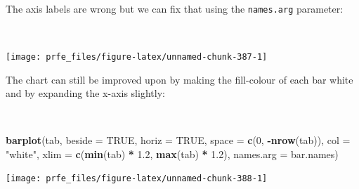 \documentclass[12pt,a4paper]{book}
\newenvironment{Shaded}{\begin{snugshade}}{\end{snugshade}}
\newcommand{\DataTypeTok}[1]{\textcolor[rgb]{0.13,0.29,0.53}{#1}}
\newcommand{\DecValTok}[1]{\textcolor[rgb]{0.00,0.00,0.81}{#1}}
\newcommand{\FloatTok}[1]{\textcolor[rgb]{0.00,0.00,0.81}{#1}}
\newcommand{\KeywordTok}[1]{\textcolor[rgb]{0.13,0.29,0.53}{\textbf{#1}}}
\newcommand{\NormalTok}[1]{#1}
\newcommand{\OperatorTok}[1]{\textcolor[rgb]{0.81,0.36,0.00}{\textbf{#1}}}
\newcommand{\OtherTok}[1]{\textcolor[rgb]{0.56,0.35,0.01}{#1}}
\newcommand{\StringTok}[1]{\textcolor[rgb]{0.31,0.60,0.02}{#1}}
\theoremstyle{definition}
\theoremstyle{definition}
\theoremstyle{definition}
\theoremstyle{remark}
\begin{document}
~

The axis labels are wrong but we can fix that using the
\texttt{names.arg} parameter:

~

\begin{Shaded}
\end{Shaded}

\begin{center}\texttt{[image: prfe\_files/figure-latex/unnamed-chunk-387-1]} \end{center}

\newpage

The chart can still be improved upon by making the fill-colour of each
bar white and by expanding the x-axis slightly:

~

\begin{Shaded}
\begin{Highlighting}[]
\KeywordTok{barplot}\NormalTok{(tab, }\DataTypeTok{beside =} \OtherTok{TRUE}\NormalTok{, }\DataTypeTok{horiz =} \OtherTok{TRUE}\NormalTok{, }\DataTypeTok{space =} \KeywordTok{c}\NormalTok{(}\DecValTok{0}\NormalTok{, }\OperatorTok{-}\KeywordTok{nrow}\NormalTok{(tab)),}
        \DataTypeTok{col =} \StringTok{"white"}\NormalTok{, }\DataTypeTok{xlim =} \KeywordTok{c}\NormalTok{(}\KeywordTok{min}\NormalTok{(tab) }\OperatorTok{*}\StringTok{ }\FloatTok{1.2}\NormalTok{, }\KeywordTok{max}\NormalTok{(tab) }\OperatorTok{*}\StringTok{ }\FloatTok{1.2}\NormalTok{),}
        \DataTypeTok{names.arg =}\NormalTok{ bar.names)}
\end{Highlighting}
\end{Shaded}

\begin{center}\texttt{[image: prfe\_files/figure-latex/unnamed-chunk-388-1]} \end{center}

~
\end{document}
